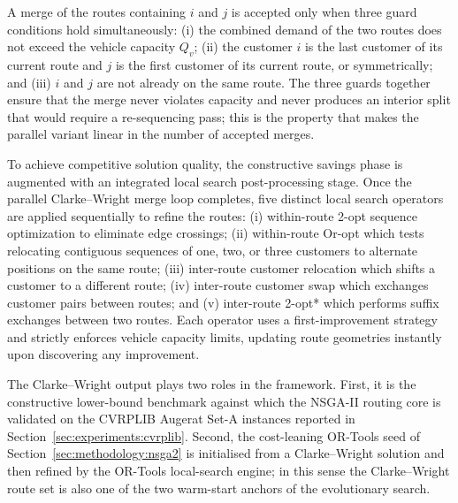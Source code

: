 \documentclass[review,preprint,authoryear,12pt]{elsarticle}
\begin{document}
A merge of the routes containing $i$ and $j$ is accepted only when
three guard conditions hold simultaneously: (i) the combined demand
of the two routes does not exceed the vehicle capacity $Q_v$; (ii)
the customer $i$ is the last customer of its current route and $j$
is the first customer of its current route, or symmetrically; and
(iii) $i$ and $j$ are not already on the same route. The three
guards together ensure that the merge never violates capacity and
never produces an interior split that would require a re-sequencing
pass; this is the property that makes the parallel variant linear in
the number of accepted merges.

To achieve competitive solution quality, the constructive savings phase is augmented with an integrated local search post-processing stage. Once the parallel Clarke--Wright merge loop completes, five distinct local search operators are applied sequentially to refine the routes: (i) within-route 2-opt sequence optimization to eliminate edge crossings; (ii) within-route Or-opt which tests relocating contiguous sequences of one, two, or three customers to alternate positions on the same route; (iii) inter-route customer relocation which shifts a customer to a different route; (iv) inter-route customer swap which exchanges customer pairs between routes; and (v) inter-route 2-opt* which performs suffix exchanges between two routes. Each operator uses a first-improvement strategy and strictly enforces vehicle capacity limits, updating route geometries instantly upon discovering any improvement.

The Clarke--Wright output plays two roles in the framework. First,
it is the constructive lower-bound benchmark against which the
NSGA-II routing core is validated on the CVRPLIB Augerat Set-A
instances reported in Section~\ref{sec:experiments:cvrplib}. Second,
the cost-leaning OR-Tools seed of
Section~\ref{sec:methodology:nsga2} is initialised from a
Clarke--Wright solution and then refined by the OR-Tools local-search
engine; in this sense the Clarke--Wright route set is also one of
the two warm-start anchors of the evolutionary search.
\end{document}
